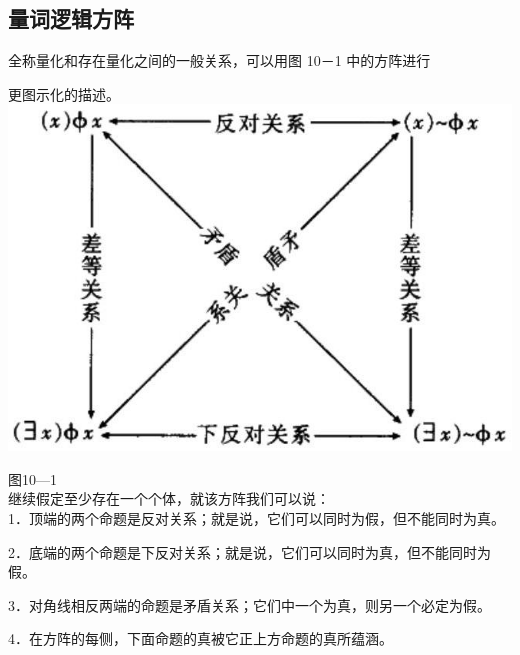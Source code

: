 \subsection{量词逻辑方阵}

全称量化和存在量化之间的一般关系，可以用图 10－1 中的方阵进行

更图示化的描述。\\
\includegraphics[width=\textwidth]{images/2025_05_15_6a28331d5e7c993ad07ag-463.jpg}

图10—1\\
继续假定至少存在一个个体，就该方阵我们可以说：\\
1．顶端的两个命题是反对关系；就是说，它们可以同时为假，但不能同时为真。

2．底端的两个命题是下反对关系；就是说，它们可以同时为真，但不能同时为假。

3．对角线相反两端的命题是矛盾关系；它们中一个为真，则另一个必定为假。

4．在方阵的每侧，下面命题的真被它正上方命题的真所蕴涵。 

